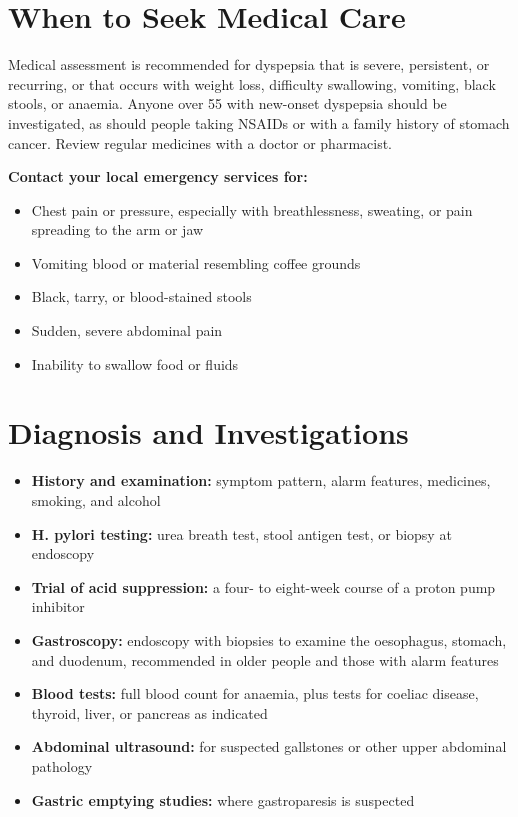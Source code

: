 \section*{When to Seek Medical Care}
Medical assessment is recommended for dyspepsia that is severe, persistent, or recurring, or that occurs with weight loss, difficulty swallowing, vomiting, black stools, or anaemia. Anyone over 55 with new-onset dyspepsia should be investigated, as should people taking NSAIDs or with a family history of stomach cancer. Review regular medicines with a doctor or pharmacist.

\textbf{Contact your local emergency services for:}
\begin{itemize}
    \item Chest pain or pressure, especially with breathlessness, sweating, or pain spreading to the arm or jaw
    \item Vomiting blood or material resembling coffee grounds
    \item Black, tarry, or blood-stained stools
    \item Sudden, severe abdominal pain
    \item Inability to swallow food or fluids
\end{itemize}

\section*{Diagnosis and Investigations}
\begin{itemize}
    \item \textbf{History and examination:} symptom pattern, alarm features, medicines, smoking, and alcohol
    \item \textbf{H. pylori testing:} urea breath test, stool antigen test, or biopsy at endoscopy
    \item \textbf{Trial of acid suppression:} a four- to eight-week course of a proton pump inhibitor
    \item \textbf{Gastroscopy:} endoscopy with biopsies to examine the oesophagus, stomach, and duodenum, recommended in older people and those with alarm features
    \item \textbf{Blood tests:} full blood count for anaemia, plus tests for coeliac disease, thyroid, liver, or pancreas as indicated
    \item \textbf{Abdominal ultrasound:} for suspected gallstones or other upper abdominal pathology
    \item \textbf{Gastric emptying studies:} where gastroparesis is suspected
\end{itemize}

